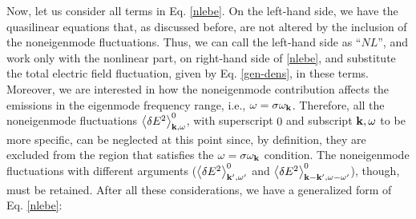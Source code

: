 \documentclass[12pt,a4paper,ruledheader]{report}
\begin{document}
Now, let us consider all terms in Eq. \eqref{nlebe}. On the
left-hand side, we have the quasilinear equations that, as
discussed before, are not altered by the inclusion of the
noneigenmode fluctuations. Thus, we can call the left-hand
side as ``$NL$'', and work only with the nonlinear part, on
right-hand side of \eqref{nlebe}, and substitute the total
electric field fluctuation, given by Eq. \eqref{gen-dens},
in these terms. Moreover, we are interested in how the
noneigenmode contribution affects the emissions in the
eigenmode frequency range, i.e., $\omega=\sigma \omega_{\bf k}$.
Therefore, all the noneigenmode fluctuations $\left<\delta E^2
\right>_{{\bf k}, \omega}^0$, with superscript $0$ and subscript
${\bf k},\omega$ to be more specific, can be neglected at this
point since, by definition, they are excluded from the region
that satisfies the $\omega=\sigma\omega_{\bf k}$ condition.
The noneigenmode fluctuations with different arguments
($\left< \delta E^2\right>_{{\bf k'},\omega '}^0$ and
$\left< \delta E^2\right>_{{\bf k-k'},\omega-\omega '}^0$),
though, must be retained. After all these considerations,
we have a generalized form of Eq. \eqref{nlebe}:
\end{document}
